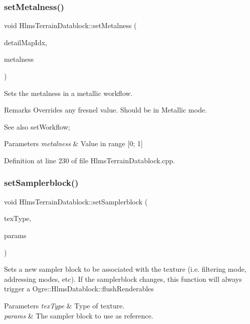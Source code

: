 \subsubsection{\texorpdfstring{set\+Metalness()}{setMetalness()}}
{\footnotesize\ttfamily void Hlms\+Terrain\+Datablock\+::set\+Metalness (\begin{DoxyParamCaption}\item[{Ogre\+::uint8}]{detail\+Map\+Idx,  }\item[{float}]{metalness }\end{DoxyParamCaption})}

Sets the metalness in a metallic workflow. \begin{DoxyRemark}{Remarks}
Overrides any fresnel value. Should be in Metallic mode. 
\end{DoxyRemark}
\begin{DoxySeeAlso}{See also}
set\+Workflow; 
\end{DoxySeeAlso}

\begin{DoxyParams}{Parameters}
{\em metalness} & Value in range \mbox{[}0; 1\mbox{]} \\
\hline
\end{DoxyParams}


Definition at line 230 of file Hlms\+Terrain\+Datablock.\+cpp.

\mbox{\label{class_hlms_terrain_datablock_a4e7f40cdd79957bdbfbfd77ecd511c9a}} 
\subsubsection{\texorpdfstring{set\+Samplerblock()}{setSamplerblock()}}
{\footnotesize\ttfamily void Hlms\+Terrain\+Datablock\+::set\+Samplerblock (\begin{DoxyParamCaption}\item[{Terrain\+Texture\+Types}]{tex\+Type,  }\item[{const Ogre\+::\+Hlms\+Samplerblock \&}]{params }\end{DoxyParamCaption})}

Sets a new sampler block to be associated with the texture (i.\+e. filtering mode, addressing modes, etc). If the samplerblock changes, this function will always trigger a Ogre\+::\+Hlms\+Datablock\+::flush\+Renderables 
\begin{DoxyParams}{Parameters}
{\em tex\+Type} & Type of texture. \\
\hline
{\em params} & The sampler block to use as reference. \\
\hline
\end{DoxyParams}


